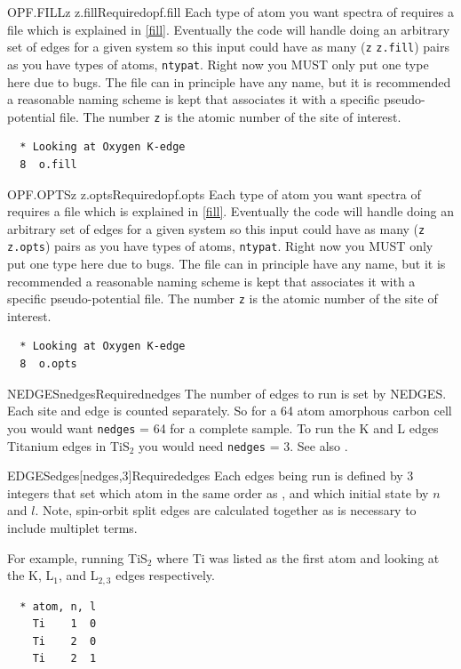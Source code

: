\documentclass[11pt]{report}
\begin{document}
\begin{Card}{OPF.FILL}{z z.fill}{Required}{opf.fill}
Each type of atom you want spectra of requires a  file which is explained in \ref{fill}. Eventually the code will handle doing an arbitrary set of edges for a given system so this input could have as many (\texttt{z} \texttt{z.fill}) pairs as you have types of atoms, \texttt{ntypat}. Right now you MUST only put one type here due to bugs. The file  can in principle have any name, but it is recommended a reasonable naming scheme is kept that associates it with a specific pseudo-potential file. The number \texttt{z} is the atomic number of the site of interest.

\begin{verbatim}
  * Looking at Oxygen K-edge
  8  o.fill
\end{verbatim}
\end{Card}

\begin{Card}{OPF.OPTS}{z z.opts}{Required}{opf.opts}
Each type of atom you want spectra of requires a  file which is explained in \ref{fill}. Eventually the code will handle doing an arbitrary set of edges for a given system so this input could have as many (\texttt{z} \texttt{z.opts}) pairs as you have types of atoms, \texttt{ntypat}. Right now you MUST only put one type here due to bugs. The file  can in principle have any name, but it is recommended a reasonable naming scheme is kept that associates it with a specific pseudo-potential file. The number \texttt{z} is the atomic number of the site of interest.

\begin{verbatim}
  * Looking at Oxygen K-edge
  8  o.opts
\end{verbatim}
\end{Card}

\begin{Card}{NEDGES}{nedges}{Required}{nedges}
The number of edges to run is set by NEDGES. Each site and edge is counted separately. So for a 64 atom amorphous carbon cell you would want \texttt{nedges} = 64 for a complete sample. To run the K and L edges Titanium edges in TiS$_2$ you would need \texttt{nedges} = 3. See also .
\end{Card}

\begin{Card}{EDGES}{edges[nedges,3]}{Required}{edges}
Each edges being run is defined by 3 integers that set which atom in the same order as , and which initial state by $n$ and $l$. Note, spin-orbit split edges are calculated together as is necessary to include multiplet terms.

For example, running TiS$_2$ where Ti was listed as the first atom and looking at the K, L$_1$, and L$_{2,3}$ edges respectively.
\begin{verbatim}
  * atom, n, l
    Ti    1  0
    Ti    2  0
    Ti    2  1
\end{verbatim}
\end{Card}
\end{document}
